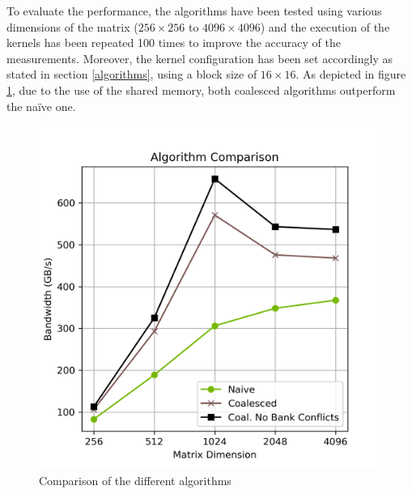 \documentclass{IEEEconf}
\begin{document}
To evaluate the performance, the algorithms have been tested using various dimensions of the matrix ($256 \times 256$ to $4096 \times 4096$) and
the execution of the kernels has been repeated 100 times to improve the accuracy of the measurements.
Moreover, the kernel configuration has been set accordingly as stated in section \ref{algorithms}, using a block size of $16 \times 16$.
As depicted in figure \ref{fig:algorithm_comparison}, due to the use of the shared memory, both coalesced algorithms outperform the na\"{i}ve one.
\begin{figure}
    \centering
    \includegraphics[width=\columnwidth]{report/img/algorithm_comparison.png}
    \caption{Comparison of the different algorithms}
    \label{fig:algorithm_comparison}
\end{figure}
\end{document}
